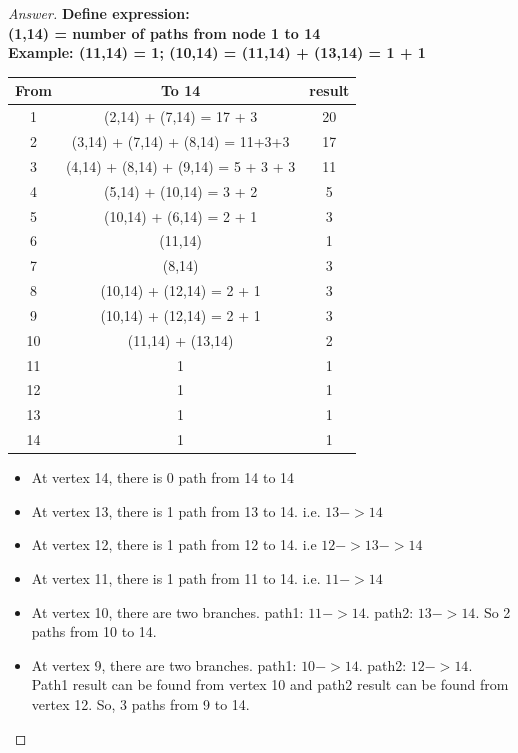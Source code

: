 \documentclass[11pt]{article}
\theoremstyle{definition}
\theoremstyle{definition}
\theoremstyle{definition}
\begin{document}
\begin{proof}[Answer]
\textbf{Define expression:\\}
\textbf{(1,14) = number of paths from node 1 to 14\\}
\textbf{Example: (11,14) = 1; (10,14) = (11,14) + (13,14) = 1 + 1}
\begin{center}
\begin{tabular}[c]{c|c|c} 
From& To 14 & result \\\hline
1 & (2,14) + (7,14) = 17 + 3 & 20\\
2 & (3,14) + (7,14) + (8,14) = 11+3+3 & 17\\
3 & (4,14) + (8,14) + (9,14) = 5 + 3 + 3 & 11\\
4 & (5,14) + (10,14) = 3 + 2 & 5\\
5 & (10,14) + (6,14) = 2 + 1 & 3\\
6 & (11,14) & 1\\
7 & (8,14) & 3\\
8 &	(10,14) + (12,14) = 2 + 1 & 3\\
9 &  (10,14) + (12,14) = 2 + 1  &3\\
10 &  (11,14) + (13,14)  &2\\
11 & 1&1\\
12 & 1&1\\
13 & 1&1\\
14 & 1&1
\end{tabular}
\end{center}	

\begin{itemize}
\item At vertex 14, there is 0 path from 14 to 14
\item At vertex 13, there is 1 path from 13 to 14. i.e. $13->14$
\item At vertex 12, there is 1 path from 12 to 14. i.e $12->13->14$
\item At vertex 11, there is 1 path from 11 to 14. i.e. $11->14$
\item At vertex 10, there are two branches. path1: $11->14$. path2: $13->14$. So 2 paths from 10 to 14.
\item At vertex 9, there are two branches. path1: $10->14$. path2: $12->14$. Path1 result can be found from vertex 10 and path2 result can be found from vertex 12. So, 3 paths from 9 to 14.
\end{itemize}
\end{proof}




\newpage
\end{document}
